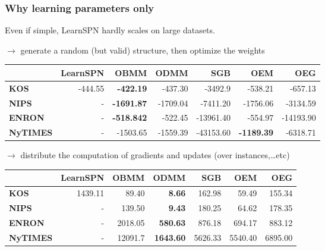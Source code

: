 \documentclass[10pt, t, xcolor={usenames,dvipsnames,svgnames}, compress]{beamer}
\begin{document}
\begin{frame}
  \frametitle{Why learning parameters only}
  Even if simple, \textsf{LearnSPN} hardly scales on large datasets.\par
  $\rightarrow$ generate a random (but valid) structure, then optimize the weights
  \begin{table}
    \centering
    \scriptsize
    \setlength{\tabcolsep}{3pt}  
    \begin{tabular}{l r r r r r r}
      \toprule
      & \textsf{LearnSPN}& \textsf{OBMM} & \textsf{ODMM} & \textsf{SGB} & \textsf{OEM} & \textsf{OEG} \\
      \midrule
      \textbf{KOS} & -444.55 & \textbf{-422.19} & -437.30 & -3492.9 & -538.21 & -657.13\\
      \textbf{NIPS} & - &  \textbf{-1691.87}& -1709.04& -7411.20& -1756.06 & -3134.59 \\
      \textbf{ENRON} & - &\textbf{-518.842}& -522.45& -13961.40& -554.97 & -14193.90\\
      \textbf{NyTIMES} & - & -1503.65& -1559.39& -43153.60& \textbf{-1189.39} & -6318.71\\
      \bottomrule
    \end{tabular}
    \label{tab:model-accs}
  \end{table}

  $\rightarrow$ distribute the computation of gradients and updates
  (over instances,\dots etc)
  \begin{table}
    \centering
    \scriptsize
    \setlength{\tabcolsep}{3pt}  
    \begin{tabular}{l r r r r r r}
      \toprule
      & \textsf{LearnSPN}& \textsf{OBMM} & \textsf{ODMM} & \textsf{SGB} & \textsf{OEM} & \textsf{OEG} \\
      \midrule
      \textbf{KOS} & 1439.11 & 89.40 & \textbf{8.66} & 162.98 & 59.49 & 155.34\\
      \textbf{NIPS} & - &  139.50& \textbf{9.43}& 180.25& 64.62 & 178.35 \\
      \textbf{ENRON} & - &2018.05& \textbf{580.63}& 876.18& 694.17 & 883.12\\
      \textbf{NyTIMES} & - & 12091.7& \textbf{1643.60}& 5626.33& 5540.40 & 6895.00\\
      \bottomrule
    \end{tabular}
    \label{tab:model-accs}
  \end{table}

\end{frame}
\end{document}
